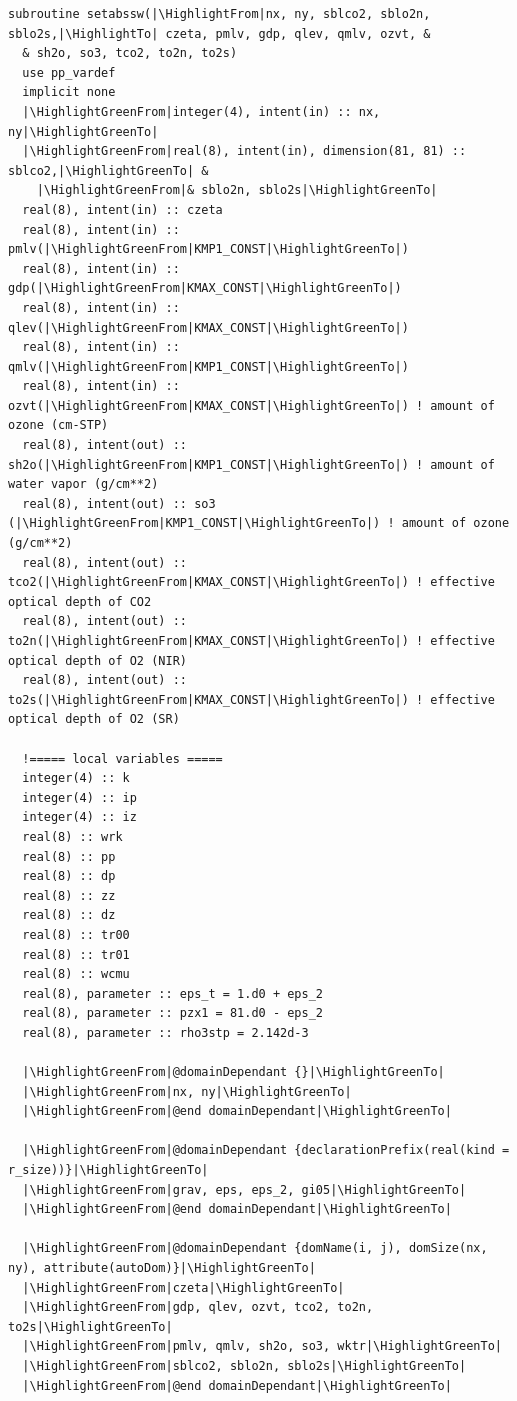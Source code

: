 \begin{lstlisting}[firstnumber=1, name=absswHybrid, label=listing:absswHybrid, caption={Example ASUCA kernel subroutine in Hybrid Fortran}, escapechar=|]
subroutine setabssw(|\HighlightFrom|nx, ny, sblco2, sblo2n, sblo2s,|\HighlightTo| czeta, pmlv, gdp, qlev, qmlv, ozvt, &
  & sh2o, so3, tco2, to2n, to2s)
  use pp_vardef
  implicit none
  |\HighlightGreenFrom|integer(4), intent(in) :: nx, ny|\HighlightGreenTo|
  |\HighlightGreenFrom|real(8), intent(in), dimension(81, 81) :: sblco2,|\HighlightGreenTo| &
    |\HighlightGreenFrom|& sblo2n, sblo2s|\HighlightGreenTo|
  real(8), intent(in) :: czeta
  real(8), intent(in) :: pmlv(|\HighlightGreenFrom|KMP1_CONST|\HighlightGreenTo|)
  real(8), intent(in) :: gdp(|\HighlightGreenFrom|KMAX_CONST|\HighlightGreenTo|)
  real(8), intent(in) :: qlev(|\HighlightGreenFrom|KMAX_CONST|\HighlightGreenTo|)
  real(8), intent(in) :: qmlv(|\HighlightGreenFrom|KMP1_CONST|\HighlightGreenTo|)
  real(8), intent(in) :: ozvt(|\HighlightGreenFrom|KMAX_CONST|\HighlightGreenTo|) ! amount of ozone (cm-STP)
  real(8), intent(out) :: sh2o(|\HighlightGreenFrom|KMP1_CONST|\HighlightGreenTo|) ! amount of water vapor (g/cm**2)
  real(8), intent(out) :: so3 (|\HighlightGreenFrom|KMP1_CONST|\HighlightGreenTo|) ! amount of ozone (g/cm**2)
  real(8), intent(out) :: tco2(|\HighlightGreenFrom|KMAX_CONST|\HighlightGreenTo|) ! effective optical depth of CO2
  real(8), intent(out) :: to2n(|\HighlightGreenFrom|KMAX_CONST|\HighlightGreenTo|) ! effective optical depth of O2 (NIR)
  real(8), intent(out) :: to2s(|\HighlightGreenFrom|KMAX_CONST|\HighlightGreenTo|) ! effective optical depth of O2 (SR)

  !===== local variables =====
  integer(4) :: k
  integer(4) :: ip
  integer(4) :: iz
  real(8) :: wrk
  real(8) :: pp
  real(8) :: dp
  real(8) :: zz
  real(8) :: dz
  real(8) :: tr00
  real(8) :: tr01
  real(8) :: wcmu
  real(8), parameter :: eps_t = 1.d0 + eps_2
  real(8), parameter :: pzx1 = 81.d0 - eps_2
  real(8), parameter :: rho3stp = 2.142d-3

  |\HighlightGreenFrom|@domainDependant {}|\HighlightGreenTo|
  |\HighlightGreenFrom|nx, ny|\HighlightGreenTo|
  |\HighlightGreenFrom|@end domainDependant|\HighlightGreenTo|
  
  |\HighlightGreenFrom|@domainDependant {declarationPrefix(real(kind = r_size))}|\HighlightGreenTo|
  |\HighlightGreenFrom|grav, eps, eps_2, gi05|\HighlightGreenTo|
  |\HighlightGreenFrom|@end domainDependant|\HighlightGreenTo|

  |\HighlightGreenFrom|@domainDependant {domName(i, j), domSize(nx, ny), attribute(autoDom)}|\HighlightGreenTo|
  |\HighlightGreenFrom|czeta|\HighlightGreenTo|
  |\HighlightGreenFrom|gdp, qlev, ozvt, tco2, to2n, to2s|\HighlightGreenTo|
  |\HighlightGreenFrom|pmlv, qmlv, sh2o, so3, wktr|\HighlightGreenTo|
  |\HighlightGreenFrom|sblco2, sblo2n, sblo2s|\HighlightGreenTo|
  |\HighlightGreenFrom|@end domainDependant|\HighlightGreenTo|


\end{lstlisting}
